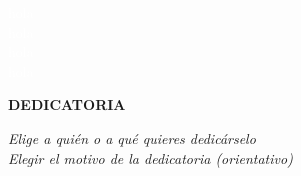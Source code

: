 \textcolor{white}{
hola \\
hola \\
hola \\
hola \\
}
\begin{flushright}
\LARGE{\textbf{DEDICATORIA}}
\end{flushright}


\begin{flushright}
\textit{Elige a quién o a qué quieres dedicárselo \\
Elegir el motivo de la dedicatoria (orientativo)
}
\end{flushright}